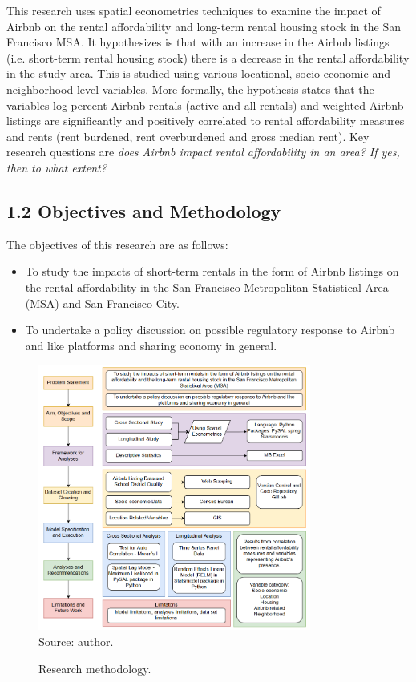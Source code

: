 \documentclass[10pt,letterpaper,onecolumn]{article}
\begin{document}
This research uses spatial econometrics techniques to examine the impact
of Airbnb on the rental affordability and long-term rental housing stock
in the San Francisco MSA. It hypothesizes is that with an increase in
the Airbnb listings (i.e. short-term rental housing stock) there is a
decrease in the rental affordability in the study area. This is studied
using various locational, socio-economic and neighborhood level
variables. More formally, the hypothesis states that the variables log
percent Airbnb rentals (active and all rentals) and weighted Airbnb
listings are significantly and positively correlated to rental
affordability measures and rents (rent burdened, rent overburdened and
gross median rent). Key research questions are \emph{does Airbnb impact
rental affordability in an area? If yes, then to what extent?}

\subsection*{1.2 Objectives and Methodology}\label{objectives-and-methodology}
The objectives of this research are as follows:

\begin{itemize}
\item
  To study the impacts of short-term rentals in the form of Airbnb
  listings on the rental affordability in the San Francisco Metropolitan
  Statistical Area (MSA) and San Francisco City.
\item
  To undertake a policy discussion on possible regulatory response to
  Airbnb and like platforms and sharing economy in general.
\end{itemize}

\begin{figure}[H]
  \centering
  \includegraphics[width=0.8\textwidth]{Research_Methodology.png}
  \\{\hfill\scriptsize Source: author.\hspace{1.3cm}}
  \caption{Research methodology.}
\end{figure}
\end{document}

